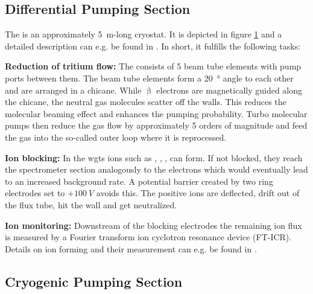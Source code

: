 \subsection{Differential Pumping Section}
\label{sec:diffPumpingSection}
\begin{figure}[t]
 \label{fig:dps}
\end{figure}
The  is an approximately \SI{5}{m}-long cryostat. It is depicted in figure \ref{fig:dps} and a detailed description can e.g. be found in \cite{Kosmider2012}. In short, it fulfills the following tasks:

{\par\textbf{Reduction of tritium flow:}
The  consists of 5 beam tube elements with pump ports between them. The beam tube elements form a \SI{20}{\degree} angle to each other and are arranged in a chicane. While $\upbeta$ electrons are magnetically guided along the chicane, the neutral gas molecules scatter off the walls. This reduces the molecular beaming effect and enhances the pumping probability. Turbo molecular pumps then reduce the gas flow by approximately 5 orders of magnitude and feed the gas into the so-called outer loop where it is reprocessed.}

{\par\textbf{Ion blocking:}
In the \gls{wgts} ions such as , , ,  can form. If not blocked, they reach the spectrometer section analogously to the electrons which would eventually lead to an increased background rate. A potential barrier created by two ring electrodes set to $+\SI{100}{V}$ avoids this. The positive ions are deflected, drift out of the flux tube, hit the wall and get neutralized.}

{\par\textbf{Ion monitoring:}
Downstream of the blocking electrodes the remaining ion flux is measured by a Fourier transform ion cyclotron resonance device (FT-ICR). Details on ion forming and their measurement can e.g. be found in \cite{Ubieto2009}.}

\subsection{Cryogenic Pumping Section}
\label{sec:cryoPumpingSection}
\begin{figure}[t]
 \label{fig:cps}
\end{figure}

